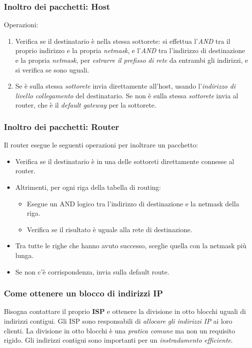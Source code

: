 \subsubsection{Inoltro dei pacchetti: Host}
Operazioni:
\begin{enumerate}
  \item Verifica se il destinatario è nella stessa sottorete: si effettua l'\textit{AND} tra il proprio indirizzo e la propria \textit{netmask}, e l'\textit{AND} tra l'indirizzo di destinazione e la propria \textit{netmask}, per \textit{estrarre il prefisso di rete} da entrambi gli indirizzi, e si verifica se sono uguali.
  \item Se è sulla stessa \textit{sottorete} invia direttamente all'host, usando l'\textit{indirizzo di livello collegamento} del destinatario. Se non è sulla stessa \textit{sottorete} invia al router, che è il \textit{default gateway} per la sottorete.
\end{enumerate}

\subsubsection{Inoltro dei pacchetti: Router}
Il router esegue le seguenti operazioni per inoltrare un pacchetto:
\begin{itemize}
  \item Verifica se il destinatario è in una delle sottoreti direttamente connesse al router.
  \item Altrimenti, per ogni riga della tabella di routing:
  \begin{itemize}
    \item Esegue un AND logico tra l'indirizzo di destinazione e la netmask della riga.
    \item Verifica se il risultato è uguale alla rete di destinazione.
  \end{itemize}
  \item Tra tutte le righe che hanno avuto successo, sceglie quella con la netmask più lunga.
  \item Se non c'è corrispondenza, invia sulla default route.
\end{itemize}

\subsubsection{Come ottenere un blocco di indirizzi IP}
Bisogna contattare il proprio \textbf{ISP} e ottenere la divisione in otto blocchi uguali di indirizzi contigui. Gli ISP sono responsabili di \textit{allocare gli indirizzi IP} ai loro clienti. La divisione in otto blocchi è una \textit{pratica comune} ma non un requisito rigido. Gli indirizzi contigui sono importanti per un \textit{instradamento efficiente}.

